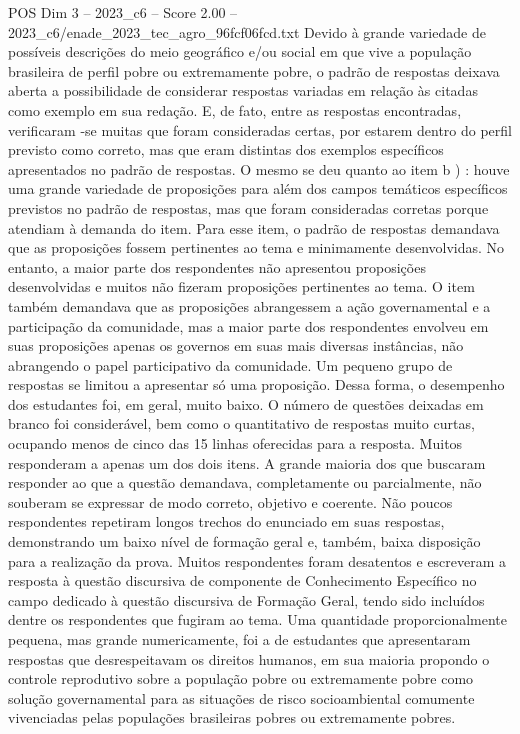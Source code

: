 \begin{textsample}{POS Dim 3 – 2023\_c6 – Score 2.00 – 2023\_c6/enade\_2023\_tec\_agro\_96fcf06fcd.txt}
Devido à grande variedade de possíveis descrições do meio geográfico e/ou social em que vive a população brasileira de perfil pobre ou extremamente pobre, o padrão de respostas deixava aberta a possibilidade de considerar respostas variadas em relação às citadas como exemplo em sua redação.
E, de fato, entre as respostas encontradas, verificaram -se muitas que foram consideradas certas, por estarem dentro do perfil previsto como correto, mas que eram distintas dos exemplos específicos apresentados no padrão de respostas.
O mesmo se deu quanto ao item b ) : houve uma grande variedade de proposições para além dos campos temáticos específicos previstos no padrão de respostas, mas que foram consideradas corretas porque atendiam à demanda do item.
Para esse item, o padrão de respostas demandava que as proposições fossem pertinentes ao tema e minimamente desenvolvidas.
No entanto, a maior parte dos respondentes não apresentou proposições desenvolvidas e muitos não fizeram proposições pertinentes ao tema.
O item também demandava que as proposições abrangessem a ação governamental e a participação da comunidade, mas a maior parte dos respondentes envolveu em suas proposições apenas os governos em suas mais diversas instâncias, não abrangendo o papel participativo da comunidade.
Um pequeno grupo de respostas se limitou a apresentar só uma proposição.
Dessa forma, o desempenho dos estudantes foi, em geral, muito baixo.
O número de questões deixadas em branco foi considerável, bem como o quantitativo de respostas muito curtas, ocupando menos de cinco das 15 linhas oferecidas para a resposta.
Muitos responderam a apenas um dos dois itens.
A grande maioria dos que buscaram responder ao que a questão demandava, completamente ou parcialmente, não souberam se expressar de modo correto, objetivo e coerente.
Não poucos respondentes repetiram longos trechos do enunciado em suas respostas, demonstrando um baixo nível de formação geral e, também, baixa disposição para a realização da prova.
Muitos respondentes foram desatentos e escreveram a resposta à questão discursiva de componente de Conhecimento Específico no campo dedicado à questão discursiva de Formação Geral, tendo sido incluídos dentre os respondentes que fugiram ao tema.
Uma quantidade proporcionalmente pequena, mas grande numericamente, foi a de estudantes que apresentaram respostas que desrespeitavam os direitos humanos, em sua maioria propondo o controle reprodutivo sobre a população pobre ou extremamente pobre como solução governamental para as situações de risco socioambiental comumente vivenciadas pelas populações brasileiras pobres ou extremamente pobres.

\end{textsample}
